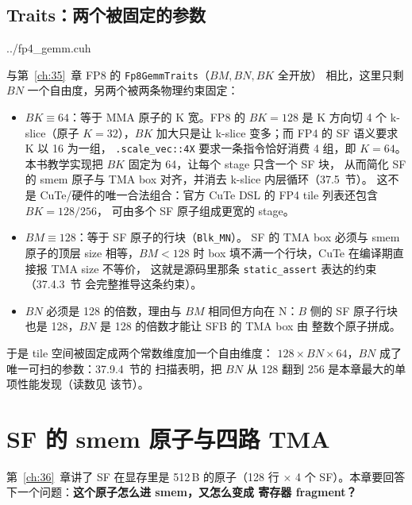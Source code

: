 \subsection{Traits：两个被固定的参数}\label{sec:37-traits}

\begin{lstinputlisting}[linerange={554-584},firstnumber=auto,
  title={fp4\_gemm.cuh L554-584（Fp4GemmTraits：tile 几何与 static\_assert）}]{../fp4_gemm.cuh}
\end{lstinputlisting}

与第~\ref{ch:35}~章 FP8 的 \texttt{Fp8GemmTraits}（$BM,BN,BK$ 全开放）
相比，这里只剩 $BN$ 一个自由度，另两个被两条物理约束固定：

\begin{itemize}[itemsep=2pt,topsep=3pt]
  \item $BK \equiv 64$：等于 MMA 原子的 K 宽。FP8 的 $BK{=}128$ 是
        K 方向切 4 个 k-slice（原子 $K{=}32$），$BK$ 加大只是让
        k-slice 变多；而 FP4 的 SF 语义要求 K 以 16 为一组，
        \texttt{.scale\_vec::4X} 要求一条指令恰好消费 4 组，即 $K{=}64$。
        本书教学实现把 $BK$ 固定为 64，让每个 stage 只含一个 SF 块，
        从而简化 SF 的 smem 原子与 TMA box 对齐，并消去 k-slice 内层循环（37.5~节）。
        这不是 CuTe/硬件的唯一合法组合：官方 CuTe DSL 的 FP4 tile 列表还包含 $BK{=}128/256$，
        可由多个 SF 原子组成更宽的 stage。
  \item $BM \equiv 128$：等于 SF 原子的行块（\texttt{Blk\_MN}）。
        SF 的 TMA box 必须与 smem 原子的顶层 size 相等，$BM<128$ 时
        box 填不满一个行块，CuTe 在编译期直接报 TMA size 不等价，
        这就是源码里那条 \texttt{static\_assert} 表达的约束（37.4.3~节
        会完整推导这条约束）。
  \item $BN$ 必须是 128 的倍数，理由与 $BM$ 相同但方向在 N：$B$ 侧的 SF
        原子行块也是 128，$BN$ 是 128 的倍数才能让 SFB 的 TMA box 由
        整数个原子拼成。
\end{itemize}

于是 tile 空间被固定成两个常数维度加一个自由维度：
$128 \times BN \times 64$，$BN$ 成了唯一可扫的参数：37.9.4~节的
扫描表明，把 $BN$ 从 128 翻到 256 是本章最大的单项性能发现（读数见
该节）。

\section{SF 的 smem 原子与四路 TMA}\label{sec:37-sf}

第~\ref{ch:36}~章讲了 SF 在显存里是 512\,B 的原子（128 行 $\times$ 4 个
SF）。本章要回答下一个问题：\textbf{这个原子怎么进 smem，又怎么变成
寄存器 fragment？}

